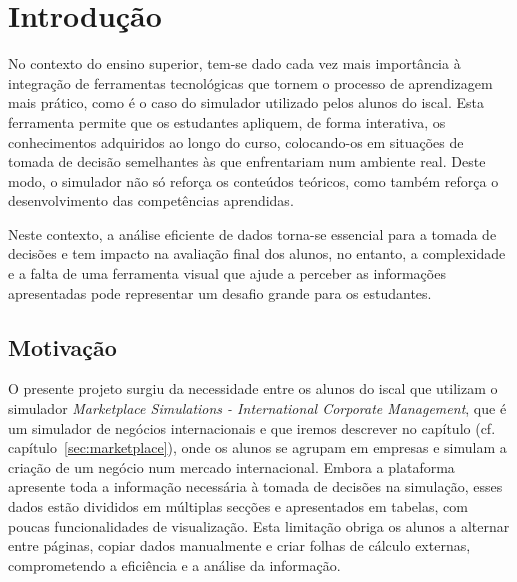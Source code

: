 

\chapter{Introdução}
\label{ch:introducao}

No contexto do ensino superior, tem-se dado cada vez mais importância à integração de ferramentas tecnológicas que tornem o processo de aprendizagem mais prático, como é o caso do simulador utilizado pelos alunos do \gls{iscal}. Esta ferramenta permite que os estudantes apliquem, de forma interativa, os conhecimentos adquiridos ao longo do curso, colocando-os em situações de tomada de decisão semelhantes às que enfrentariam num ambiente real. Deste modo, o simulador não só reforça os conteúdos teóricos, como também reforça o desenvolvimento das competências aprendidas. 

Neste contexto, a análise eficiente de dados torna-se essencial para a tomada de decisões e tem impacto na avaliação final dos alunos, no entanto, a complexidade e a falta de uma ferramenta visual que ajude a perceber as informações apresentadas pode representar um desafio grande para os estudantes.

\section{Motivação}

O presente projeto surgiu da necessidade  entre os alunos do \gls{iscal} que utilizam o simulador \textit{Marketplace Simulations - International Corporate Management}, que é um simulador de negócios internacionais e que iremos descrever no capítulo (cf. capítulo~\ref{sec:marketplace}), onde os alunos se agrupam em empresas e simulam a criação de um negócio num mercado internacional. Embora a plataforma apresente toda a informação necessária à tomada de decisões na simulação, esses dados estão divididos em múltiplas secções e apresentados em tabelas, com poucas funcionalidades de visualização. Esta limitação obriga os alunos a alternar entre páginas, copiar dados manualmente e criar folhas de cálculo externas, comprometendo a eficiência e a análise da informação.

